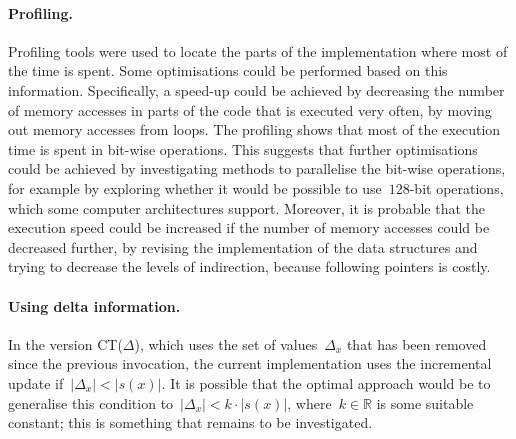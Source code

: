 \documentclass[a4paper,11pt]{article}
\theoremstyle{definition}
\numberwithin{equation}{section}
\begin{document}
\paragraph{Profiling.} Profiling tools were used to locate the parts of
the implementation where most of the time is spent. Some optimisations could
be performed based on this information. Specifically, a speed-up could be
achieved by decreasing the number of memory accesses in parts of the code
that is executed very often, by moving out memory accesses from loops.
The profiling shows that most of the execution time is spent in
bit-wise operations.
This suggests that further optimisations could be achieved
by investigating methods to parallelise the bit-wise operations,
for example by exploring whether
it would be possible to use~$128$-bit operations, which
some computer architectures support. Moreover, it is probable that
the execution speed could be increased if the number of memory accesses
could be decreased further, by revising the implementation of the
data structures and trying to decrease the levels of indirection,
because following pointers is costly.

\paragraph{Using delta information.} In the version CT($\Delta$), which uses
the set of values~$\Delta_x$ that has been removed since the previous invocation,
the current implementation uses the incremental update if~$|\Delta_x| < |s(x)|$.
It is possible that the optimal approach would be to generalise this condition
to~$|\Delta_x| < k \cdot |s(x)|$, where~$k \in \mathbb{R}$ is some suitable constant;
this is something that remains to be investigated.

\end{document}
